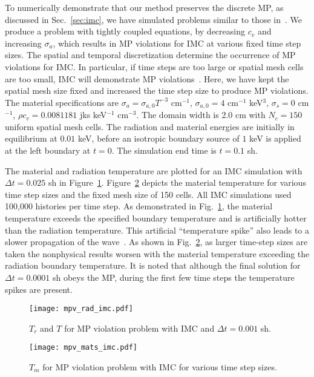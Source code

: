 To numerically demonstrate that our method preserves the discrete MP, as discussed in
Sec.~\ref{sec:imc},  we have simulated problems similar to those
in~\cite{wollaber2013discrete}.  We produce a problem with tightly coupled
equations, by decreasing $c_v$ and increasing $\sigma_a$, which results in MP violations for IMC at various fixed time step sizes. 
The spatial and temporal discretization determine the occurrence of MP violations for
IMC. In particular, if time steps are too large or spatial
mesh cells are too small, IMC will demonstrate MP violations~\cite{wollaber2013discrete}.  Here, we have kept the
spatial mesh size fixed and increased the time step size to produce MP violations.
The material specifications are  $\sigma_{a} = \sigma_{a,0} T^{-3}$ cm$^{-1}$,
$\sigma_{a,0} = 4$ cm$^{-1}$ keV$^3$, $\sigma_s=0$ cm$^{-1}$, $\rho c_v = 0.0081181$
jks keV$^{-1}$ cm$^{-3}$.  The domain width is 2.0 cm with
$N_c=150$ uniform spatial mesh cells.  The radiation and material energies are initially in
equilibrium at $0.01$ keV, before an isotropic boundary source of $1$ keV is applied at
the left boundary at $t=0$. The simulation end time is $t=0.1$ sh. 

The material and radiation temperature are plotted for an IMC simulation with $\Delta
t=0.025$ sh in Figure~\ref{fig:imc_mpvrad}.  Figure~\ref{fig:imc_mpv} depicts the material temperature
for various time step sizes and the fixed mesh size of 150 cells. All IMC
simulations used 100,000 histories per time step. As demonstrated in
Fig.~\ref{fig:imc_mpvrad}, the material temperature exceeds the specified boundary
temperature and is artificially hotter than the radiation temperature.  This artificial
``temperature spike'' also leads to a slower propagation of the
wave~\cite{wollaber2013discrete}.  As shown in
Fig.~\ref{fig:imc_mpv}, as larger time-step sizes are taken the nonphysical results
worsen with the material temperature exceeding the radiation boundary temperature.
It is noted that although the final solution for $\Delta t=0.0001$ sh obeys the MP, during
the first few time steps the temperature spikes are present.
\begin{figure}[htbp]
    \centering
    \texttt{[image: mpv\_rad\_imc.pdf]}
    \caption{\label{fig:imc_mpvrad}$T_r$ and $T$ for MP violation problem with IMC and $\Delta t = 0.001$ sh.}
\end{figure}
\begin{figure}[htbp]
    \centering
    \texttt{[image: mpv\_mats\_imc.pdf]}
    \caption{\label{fig:imc_mpv}$T_m$ for MP violation problem with IMC for various time step
    sizes.}
\end{figure}


